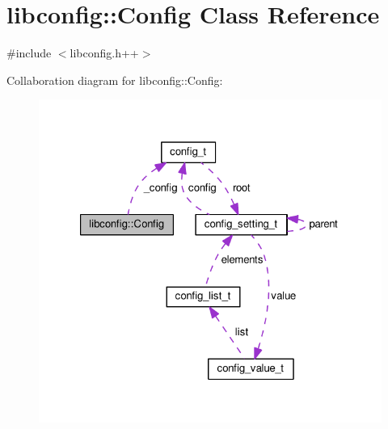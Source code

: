 \hypertarget{classlibconfig_1_1Config}{\section{libconfig\-:\-:Config Class Reference}
\label{classlibconfig_1_1Config}
}


{\ttfamily \#include $<$libconfig.\-h++$>$}



Collaboration diagram for libconfig\-:\-:Config\-:\nopagebreak
\begin{figure}[H]
\begin{center}
\leavevmode
\includegraphics[width=323pt]{classlibconfig_1_1Config__coll__graph}
\end{center}
\end{figure}
